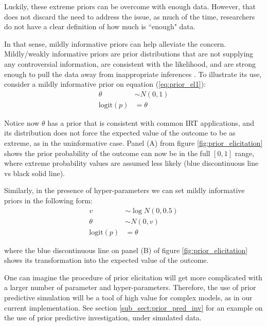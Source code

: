Luckily, these extreme priors can be overcome with enough data. However, that does not discard the need to address the issue, as much of the time, researchers do not have a clear definition of how much is ``enough" data.

In that sense, mildly informative priors can help alleviate the concern. Mildly/weakly informative priors are prior distributions that are not supplying any controversial information, are consistent with the likelihood, and are strong enough to pull the data away from inappropriate inferences \cite{Gelman_et_al_2014}. To illustrate its use, consider a mildly informative prior on equation (\ref{eq:prior_el1}):
%
\begin{equation} \label{eq:prior_el3}
	\begin{split}	
		\theta &\sim N(0, 1) \\
		\text{logit}(p) &= \theta
	\end{split}
\end{equation}

Notice now $\theta$ has a prior that is consistent with common IRT applications, and its distribution does not force the expected value of the outcome to be as extreme, as in the uninformative case. Panel (A) from figure \ref{fig:prior_elicitation} shows the prior probability of the outcome can now be in the full $[0,1]$ range, where extreme probability values are assumed less likely (blue discontinuous line vs black solid line).

Similarly, in the presence of hyper-parameters we can set mildly informative priors in the following form:
%
\begin{equation} \label{eq:prior_el4}
	\begin{split}
		v &\sim \log N(0, 0.5) \\	
		\theta &\sim N(0, v) \\
		\text{logit}(p) &= \theta
	\end{split}
\end{equation}

\noindent where the blue discontinuous line on panel (B) of figure \ref{fig:prior_elicitation} shows its transformation into the expected value of the outcome.

One can imagine the procedure of prior elicitation will get more complicated with a larger number of parameter and hyper-parameters. Therefore, the use of prior predictive simulation will be a tool of high value for complex models, as in our current implementation. See section \ref{sub_sect:prior_pred_inv} for an example on the use of prior predictive investigation, under simulated data.



